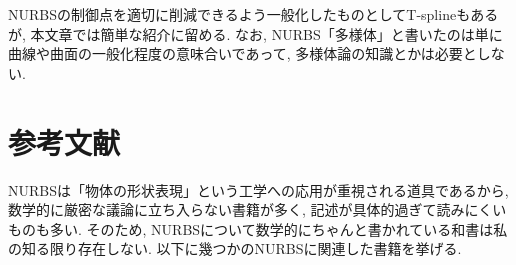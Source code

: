 \documentclass{jsarticle}
\theoremstyle{definition}%
\begin{document}


NURBSの制御点を適切に削減できるよう一般化したものとしてT-splineもあるが, 本文章では簡単な紹介に留める.
なお, NURBS「多様体」と書いたのは単に曲線や曲面の一般化程度の意味合いであって, 多様体論の知識とかは必要としない.

\section*{参考文献}
NURBSは「物体の形状表現」という工学への応用が重視される道具であるから, 数学的に厳密な議論に立ち入らない書籍が多く, 記述が具体的過ぎて読みにくいものも多い.
そのため, NURBSについて数学的にちゃんと書かれている和書は私の知る限り存在しない.
以下に幾つかのNURBSに関連した書籍を挙げる.
\end{document}
